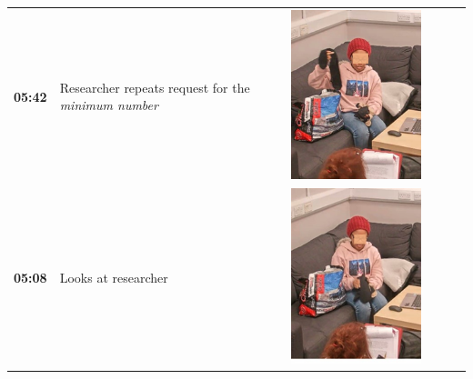 \documentclass[twocolumn, serif, empirical, authordate]{jote-article}
\begin{document}
\begin{table}[ht!]
\begin{mdframed}[linecolor=jotedark]
\begin{tabularx}{\linewidth}{@{} m{.05\linewidth} m{.2\linewidth} >{\raggedleft\arraybackslash}m{.19\linewidth}  m{.05\linewidth} m{.2\linewidth} >{\raggedleft\arraybackslash}m{.19\linewidth} }
 \textbf{05:42} & Researcher repeats request for the \emph{minimum number} & \includegraphics[height=.15\textheight, width=.8\linewidth]{media/image11.png} \\ 
 \textbf{05:08} & Looks at researcher & \includegraphics[height=.15\textheight, width=.8\linewidth]{media/image7.png} &

\end{tabularx}
\end{mdframed}
\end{table}
\end{document}
